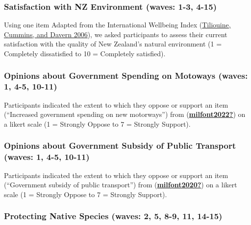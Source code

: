 \documentclass[
  singlecolumn]{report}
\begin{document}
\hypertarget{satisfaction-with-nz-environment-waves-1-3-4-15}{%
\subsubsection{Satisfaction with NZ Environment (waves: 1-3,
4-15)}\label{satisfaction-with-nz-environment-waves-1-3-4-15}}

Using one item Adapted from the International Wellbeing Index
(\protect\hyperlink{ref-tiliouine2006}{Tiliouine, Cummins, and Davern
2006}), we asked participants to assess their current satisfaction with
the quality of New Zealand's natural environment (1 = Completely
dissatisfied to 10 = Completely satisfied).

\hypertarget{opinions-about-government-spending-on-motoways-waves-1-4-5-10-11}{%
\subsubsection{Opinions about Government Spending on Motoways (waves: 1,
4-5,
10-11)}\label{opinions-about-government-spending-on-motoways-waves-1-4-5-10-11}}

Participants indicated the extent to which they oppose or support an
item (``Increased government spending on new motorways'') from
(\protect\hyperlink{ref-milfont2022}{\textbf{milfont2022?}}) on a likert
scale (1 = Strongly Oppose to 7 = Strongly Support).

\hypertarget{opinions-about-government-subsidy-of-public-transport-waves-1-4-5-10-11}{%
\subsubsection{Opinions about Government Subsidy of Public Transport
(waves: 1, 4-5,
10-11)}\label{opinions-about-government-subsidy-of-public-transport-waves-1-4-5-10-11}}

Participants indicated the extent to which they oppose or support an
item (``Government subsidy of public transport'') from
(\protect\hyperlink{ref-milfont2020}{\textbf{milfont2020?}}) on a likert
scale (1 = Strongly Oppose to 7 = Strongly Support).

\hypertarget{protecting-native-species-waves-2-5-8-9-11-14-15}{%
\subsubsection{Protecting Native Species (waves: 2, 5, 8-9, 11,
14-15)}\label{protecting-native-species-waves-2-5-8-9-11-14-15}}
\end{document}
